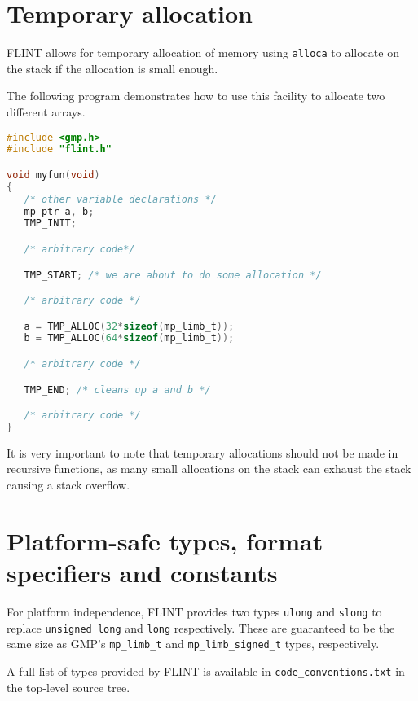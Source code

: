 \documentclass[a4paper,10pt]{book}
\newcommand{\code}{\lstinline}
\begin{document}
\chapter{Temporary allocation}

FLINT allows for temporary allocation of memory using \code{alloca}
to allocate on the stack if the allocation is small enough.

The following program demonstrates how to use this facility to
allocate two different arrays.

\begin{lstlisting}[language=C]
#include <gmp.h>
#include "flint.h"

void myfun(void)
{
   /* other variable declarations */
   mp_ptr a, b;
   TMP_INIT;

   /* arbitrary code*/

   TMP_START; /* we are about to do some allocation */

   /* arbitrary code */

   a = TMP_ALLOC(32*sizeof(mp_limb_t));
   b = TMP_ALLOC(64*sizeof(mp_limb_t));

   /* arbitrary code */

   TMP_END; /* cleans up a and b */

   /* arbitrary code */
}
\end{lstlisting}

It is very important to note that temporary allocations should not be
made in recursive functions, as many small allocations on the stack
can exhaust the stack causing a stack overflow.

\chapter{Platform-safe types, format specifiers and constants}

For platform independence, FLINT provides two types \code{ulong}
and \code{slong} to replace \code{unsigned long} and \code{long}
respectively. These are guaranteed to be the same size as GMP's
\code{mp_limb_t} and \code{mp_limb_signed_t} types, respectively.

A full list of types provided by FLINT is available in
\code{code_conventions.txt} in the top-level source tree.
\end{document}
